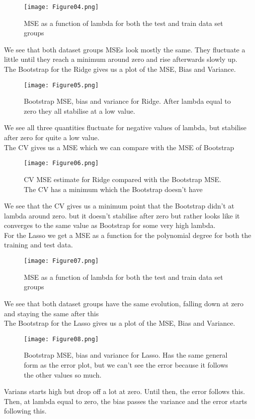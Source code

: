 \documentclass[11pt, A4paper, english]{article}
\begin{document}
\begin{multicols}{2}
\begin{figure}[H]
\texttt{[image: Figure04.png]}
\caption{MSE as a function of lambda for both the test and train data set groups}
			\end{figure}
We see that both dataset groups MSEs look mostly the same. They fluctuate a little until they reach a minimum around zero and rise afterwards slowly up. \\
The Bootstrap for the Ridge gives us a plot of the MSE, Bias and Variance.
			\begin{figure}[H]
\texttt{[image: Figure05.png]}
\caption{Bootstrap MSE, bias and variance for Ridge. After lambda equal to zero they all stabilise at a low value.}
			\end{figure}
We see all three quantities fluctuate for negative values of lambda, but stabilise after zero for quite a low value. \\
The CV gives us a MSE which we can compare with the MSE of Bootstrap
			\begin{figure}[H]
\texttt{[image: Figure06.png]}
\caption{CV MSE estimate for Ridge compared with the Bootstrap MSE. The CV has a minimum which the Bootstrap doesn't have}
			\end{figure}
We see that the CV gives us a minimum point that the Bootstrap didn't at lambda around zero. but it doesn't stabilise after zero but rather looks like it converges to the same value as Bootstrap for some very high lambda. \\
For the Lasso we get a MSE as a function for the polynomial degree for both the training and test data.
			\begin{figure}[H]
\texttt{[image: Figure07.png]}
\caption{MSE as a function of lambda for both the test and train data set groups}
			\end{figure}
We see that both dataset groups have the same evolution, falling down at zero and staying the same after this \\
The Bootstrap for the Lasso gives us a plot of the MSE, Bias and Variance.
			\begin{figure}[H]
\texttt{[image: Figure08.png]}
\caption{Bootstrap MSE, bias and variance for Lasso. Has the same general form as the error plot, but we can't see the error because it follows the other values so much.}
			\end{figure}
Varians starts high but drop off a lot at zero. Until then, the error follows this. Then, at lambda equal to zero, the bias passes the variance and the error starts following this. \\

\end{multicols}
\end{document}
